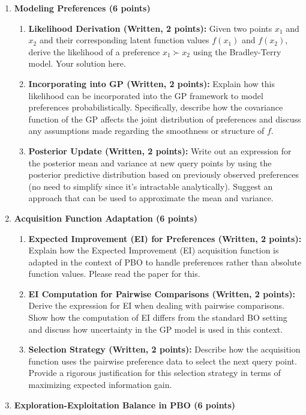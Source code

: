 \documentclass[
  letterpaper,
  numbers=noenddot,
  DIV=11]{scrreprt}
\theoremstyle{definition}
\theoremstyle{plain}
\theoremstyle{plain}
\theoremstyle{remark}
\begin{document}
\begin{enumerate}
\def\labelenumi{(\alph{enumi})}
\item
  \textbf{Modeling Preferences (6 points)}

  \begin{enumerate}
  \def\labelenumii{(\roman{enumii})}
  \item
    \textbf{Likelihood Derivation (Written, 2 points):} Given two points
    \(x_1\) and \(x_2\) and their corresponding latent function values
    \(f(x_1)\) and \(f(x_2)\), derive the likelihood of a preference
    \(x_1 \succ x_2\) using the Bradley-Terry model. Your solution here.
  \item
    \textbf{Incorporating into GP (Written, 2 points):} Explain how this
    likelihood can be incorporated into the GP framework to model
    preferences probabilistically. Specifically, describe how the
    covariance function of the GP affects the joint distribution of
    preferences and discuss any assumptions made regarding the
    smoothness or structure of \(f\).
  \item
    \textbf{Posterior Update (Written, 2 points):} Write out an
    expression for the posterior mean and variance at new query points
    by using the posterior predictive distribution based on previously
    observed preferences (no need to simplify since it's intractable
    analytically). Suggest an approach that can be used to approximate
    the mean and variance.
  \end{enumerate}
\item
  \textbf{Acquisition Function Adaptation (6 points)}

  \begin{enumerate}
  \def\labelenumii{(\roman{enumii})}
  \item
    \textbf{Expected Improvement (EI) for Preferences (Written, 2
    points):} Explain how the Expected Improvement (EI) acquisition
    function is adapted in the context of PBO to handle preferences
    rather than absolute function values. Please read the paper for
    this.
  \item
    \textbf{EI Computation for Pairwise Comparisons (Written, 2
    points):} Derive the expression for EI when dealing with pairwise
    comparisons. Show how the computation of EI differs from the
    standard BO setting and discuss how uncertainty in the GP model is
    used in this context.
  \item
    \textbf{Selection Strategy (Written, 2 points):} Describe how the
    acquisition function uses the pairwise preference data to select the
    next query point. Provide a rigorous justification for this
    selection strategy in terms of maximizing expected information gain.
  \end{enumerate}
\item
  \textbf{Exploration-Exploitation Balance in PBO (6 points)}


\end{enumerate}
\end{document}
